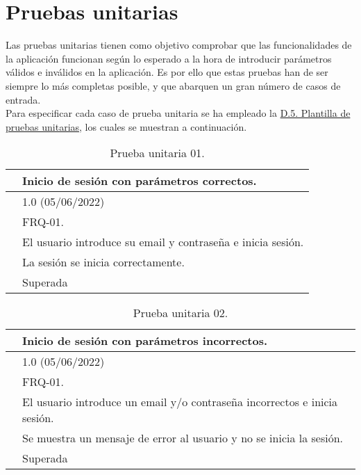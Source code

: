 \section{Pruebas unitarias}

Las pruebas unitarias \cite{pruebaunitaria} tienen como objetivo comprobar que las funcionalidades de la aplicación funcionan según lo esperado a la hora de introducir parámetros válidos e inválidos en la aplicación. Es por ello que estas pruebas han de ser siempre lo más completas posible, y que abarquen un gran número de casos de entrada. 
\\

Para especificar cada caso de prueba unitaria se ha empleado la \hyperref[enlacePUX]{D.5. Plantilla de pruebas unitarias}, los cuales se muestran a continuación.

\begin{table}[H]
\begin{center}
\begin{tabular}{|p{3cm}|p{10cm}|} \hline
\centering {\bf PU-01} & Inicio de sesión con parámetros correctos.  \\ \hline\hline
\centering {\bf Versión} & 1.0 (05/06/2022) \\ \hline
\centering {\bf Dependencias} &  FRQ-01. \\ \hline
\centering {\bf Descripción} &  El usuario introduce su email y contraseña e inicia sesión. \\ \hline
\centering {\bf Criterio de aceptación} & La sesión se inicia correctamente. \\ \hline
\centering {\bf Estado} & Superada \\ \hline
\end{tabular}
\caption{Prueba unitaria 01.}
\label{enlacePU1}
\end{center}
\end{table}

\begin{table}[H]
\begin{center}
\begin{tabular}{|p{3cm}|p{10cm}|} \hline
\centering {\bf PU-02} & Inicio de sesión con parámetros incorrectos.  \\ \hline\hline
\centering {\bf Versión} & 1.0 (05/06/2022) \\ \hline
\centering {\bf Dependencias} & FRQ-01. \\ \hline
\centering {\bf Descripción} &  El usuario introduce un email y/o contraseña incorrectos e inicia sesión. \\ \hline
\centering {\bf Criterio de aceptación} & Se muestra un mensaje de error al usuario y no se inicia la sesión. \\ \hline
\centering {\bf Estado} & Superada \\ \hline
\end{tabular}
\caption{Prueba unitaria 02.}
\label{enlacePU2}
\end{center}
\end{table}

